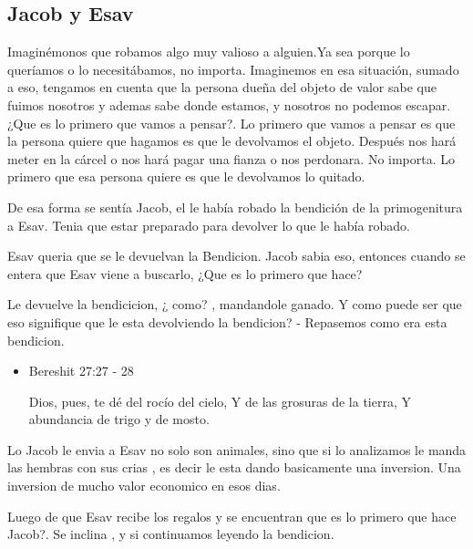 \documentclass[conference]{IEEEtran}
\begin{document}
\subsection{Jacob y Esav}

Imaginémonos que robamos algo muy valioso a alguien.Ya sea porque lo queríamos o lo necesitábamos, no importa.
Imaginemos en esa situación, sumado a eso, tengamos en cuenta que la persona dueña del objeto de valor sabe que fuimos nosotros y ademas sabe donde estamos, y nosotros no podemos escapar.¿Que es lo primero que vamos a pensar?.
Lo primero que vamos a pensar es que la persona quiere que hagamos es que le devolvamos el objeto. Después nos hará meter en la cárcel o nos hará pagar una fianza o nos perdonara. No importa. Lo primero que esa persona quiere es que le devolvamos lo quitado.

De esa forma se sentía Jacob, el le había robado la bendición de la primogenitura a Esav. Tenia que estar preparado para devolver lo que le había robado. 



%






Esav  queria que se le devuelvan la Bendicion. Jacob sabia eso, entonces cuando se entera que Esav viene a buscarlo, ¿Que es lo primero que hace? 

Le devuelve la bendicicion, ¿ como? , mandandole ganado. Y como puede ser que eso signifique que le esta devolviendo la bendicion? - Repasemos como era esta bendicion.
\begin{itemize}
\item Bereshit 27:27 - 28
 
Dios, pues, te dé del rocío del cielo,
Y de las grosuras de la tierra,
Y abundancia de trigo y de mosto.
\end{itemize}

Lo Jacob le envia a Esav no solo son animales, sino que si lo analizamos le manda las hembras con sus crias , es decir le esta dando basicamente una inversion. Una inversion de mucho valor economico en esos dias.

Luego de que Esav recibe los regalos  y se encuentran que es lo primero que hace Jacob?. Se inclina , y si continuamos leyendo la bendicion.
\end{document}
